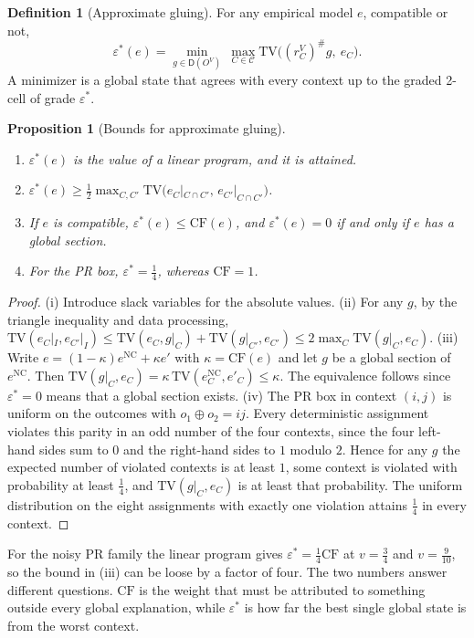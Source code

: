 \documentclass[11pt]{article}
\newtheorem{proposition}[theorem]{Proposition}
\theoremstyle{definition}
\newtheorem{definition}[theorem]{Definition}
\theoremstyle{remark}
\newcommand{\D}{\mathsf{D}}
\newcommand{\TV}{\mathrm{TV}}
\begin{document}
\begin{definition}[Approximate gluing]\label{def:epsstar}
For any empirical model $e$, compatible or not,
\[
\varepsilon^*(e)=\min_{g\in\D(O^V)}\ \max_{C\in\mathcal C}\TV\big((r^V_C)^\#g,\ e_C\big).
\]
A minimizer is a global state that agrees with every context up to the graded 2-cell of grade
$\varepsilon^*$.
\end{definition}

\begin{proposition}[Bounds for approximate gluing]\label{prop:epsstar}
\leavevmode
\begin{enumerate}[label=(\roman*)]
\item $\varepsilon^*(e)$ is the value of a linear program, and it is attained.
\item $\varepsilon^*(e)\ge\tfrac12\max_{C,C'}\TV\big(e_C|_{C\cap C'},\,e_{C'}|_{C\cap C'}\big)$.
\item If $e$ is compatible, $\varepsilon^*(e)\le\mathrm{CF}(e)$, and $\varepsilon^*(e)=0$ if and only if
  $e$ has a global section.
\item For the PR box, $\varepsilon^*=\tfrac14$, whereas $\mathrm{CF}=1$.
\end{enumerate}
\end{proposition}
\begin{proof}
(i) Introduce slack variables for the absolute values. (ii) For any $g$, by the triangle inequality and
data processing,
$\TV(e_C|_I,e_{C'}|_I)\le\TV(e_C,g|_C)+\TV(g|_{C'},e_{C'})\le2\max_C\TV(g|_C,e_C)$.
(iii) Write $e=(1-\kappa)e^{\mathrm{NC}}+\kappa e'$ with $\kappa=\mathrm{CF}(e)$ and let $g$ be a global
section of $e^{\mathrm{NC}}$. Then $\TV(g|_C,e_C)=\kappa\,\TV(e^{\mathrm{NC}}_C,e'_C)\le\kappa$. The
equivalence follows since $\varepsilon^*=0$ means that a global section exists.
(iv) The PR box in context $(i,j)$ is uniform on the outcomes with $o_1\oplus o_2=ij$. Every deterministic
assignment violates this parity in an odd number of the four contexts, since the four left-hand
sides sum to $0$ and the right-hand sides to $1$ modulo $2$. Hence for any $g$ the expected number of
violated contexts is at least $1$, some context is violated with probability at least $\tfrac14$, and
$\TV(g|_C,e_C)$ is at least that probability. The uniform distribution on the eight assignments with
exactly one violation attains $\tfrac14$ in every context.
\end{proof}

For the noisy PR family the linear program gives $\varepsilon^*=\tfrac14\mathrm{CF}$ at $v=\tfrac34$ and
$v=\tfrac9{10}$, so the bound in (iii) can be loose by a factor of four. The two numbers answer
different questions. $\mathrm{CF}$ is the weight that must be attributed to something outside every
global explanation, while $\varepsilon^*$ is how far the best single global state is from the worst
context.
\end{document}
